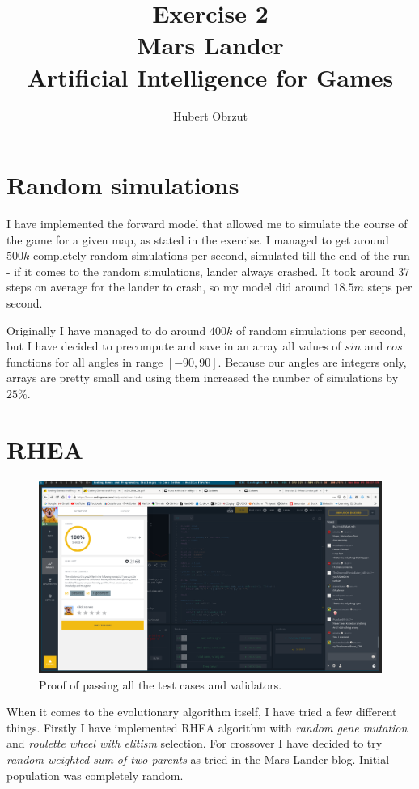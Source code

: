 \documentclass[11pt]{article}
\title{
	Exercise 2 \\
	Mars Lander \\
	Artificial Intelligence for Games \\
}
\author{Hubert Obrzut}
\begin{document}
	\maketitle
	
	\section{Random simulations}
 	I have implemented the forward model that allowed me to simulate the course of the game for a given map, as stated in the exercise. I managed to get around $500k$ completely random simulations per second, simulated till the end of the run - if it comes to the random simulations, lander always crashed. It took around $37$ steps on average for the lander to crash, so my model did around $18.5m$ steps per second.
 	
 	Originally I have managed to do around $400k$ of random simulations per second, but I have decided to precompute and save in an array all values of $sin$ and $cos$ functions for all angles in range $[-90, 90]$. Because our angles are integers only, arrays are pretty small and using them increased the number of simulations by $25\%$.
 	
 	\section{RHEA}
 	
 	\begin{figure}[h]
 	\centering
	\includegraphics[scale=0.35]{screens/mars-lander-episode2} 	
	\caption{Proof of passing all the test cases and validators.}
 	\end{figure}
	
	When it comes to the evolutionary algorithm itself, I have tried a few different things. Firstly I have implemented RHEA algorithm with \textit{random gene mutation} and \textit{roulette wheel with elitism} selection. For crossover I have decided to try \textit{random weighted sum of two parents} as tried in the  Mars Lander blog. Initial population was completely random.
	
\end{document}

